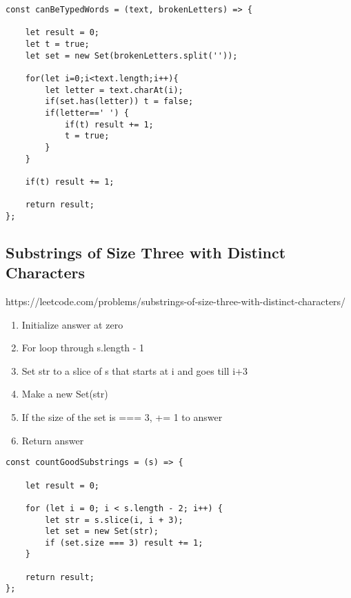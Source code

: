 \documentclass[10pt]{article}
\begin{document}
\begin{lstlisting}[title=Solution canBeTypedWords, captionpos=t]
const canBeTypedWords = (text, brokenLetters) => {

    let result = 0;
    let t = true;
    let set = new Set(brokenLetters.split(''));
    
    for(let i=0;i<text.length;i++){
        let letter = text.charAt(i);
        if(set.has(letter)) t = false;
        if(letter==' ') {
            if(t) result += 1;
            t = true;
        }
    }
    
    if(t) result += 1;
    
    return result;
};
\end{lstlisting}

\medskip %










\pagebreak %
\medskip   
\subsection{Substrings of Size Three with Distinct Characters}
https://leetcode.com/problems/substrings-of-size-three-with-distinct-characters/

\begin{enumerate}
	\item Initialize answer at zero 
	\item For loop through s.length  - 1
	\item Set str to  a slice of s that starts at i and goes till i+3
	\item Make a new Set(str)
	\item If the size of the set is === 3, += 1 to answer
	\item Return answer
\end{enumerate}

\begin{lstlisting}[title=Solution countGoodSubstrings, captionpos=t]
const countGoodSubstrings = (s) => {

    let result = 0;

    for (let i = 0; i < s.length - 2; i++) {
        let str = s.slice(i, i + 3);
        let set = new Set(str);
        if (set.size === 3) result += 1;
    }

    return result;
};

\end{lstlisting}
\end{document}

